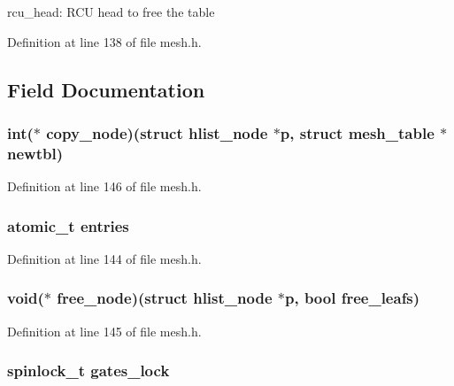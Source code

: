 rcu\-\_\-head\-: R\-C\-U head to free the table 

Definition at line 138 of file mesh.\-h.



\subsection{Field Documentation}
\hypertarget{structmesh__table_ad8a4389f749adafe9393ad7be19be3bc}{
\subsubsection[{copy\-\_\-node}]{\setlength{\rightskip}{0pt plus 5cm}int($\ast$ copy\-\_\-node)(struct hlist\-\_\-node $\ast$p, struct {\bf mesh\-\_\-table} $\ast$newtbl)}}\label{structmesh__table_ad8a4389f749adafe9393ad7be19be3bc}


Definition at line 146 of file mesh.\-h.

\hypertarget{structmesh__table_ad87bb8a66d6cd622bda213e2edf6c4a2}{
\subsubsection[{entries}]{\setlength{\rightskip}{0pt plus 5cm}atomic\-\_\-t entries}}\label{structmesh__table_ad87bb8a66d6cd622bda213e2edf6c4a2}


Definition at line 144 of file mesh.\-h.

\hypertarget{structmesh__table_a9779fca079801066cd605af403cc1eea}{
\subsubsection[{free\-\_\-node}]{\setlength{\rightskip}{0pt plus 5cm}void($\ast$ free\-\_\-node)(struct hlist\-\_\-node $\ast$p, bool free\-\_\-leafs)}}\label{structmesh__table_a9779fca079801066cd605af403cc1eea}


Definition at line 145 of file mesh.\-h.

\hypertarget{structmesh__table_aa4d60ff62c57e22498c2aac249c29391}{
\subsubsection[{gates\-\_\-lock}]{\setlength{\rightskip}{0pt plus 5cm}spinlock\-\_\-t gates\-\_\-lock}}\label{structmesh__table_aa4d60ff62c57e22498c2aac249c29391}


